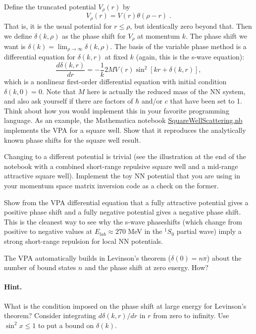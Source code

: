 \documentclass[%
oneside,                 %
final,                   %
10pt]{article}
\begin{document}
Define the truncated potential $V_\rho(r)$ by
\[
   V_\rho(r) = V(r) \theta(\rho-r) \;.
\]
That is, it is the usual potential for $r \leq \rho$, but identically
zero beyond that.  Then we define $\delta(k,\rho)$ as the phase shift
for $V_\rho$ at momentum $k$.  The phase shift we want is
$\delta(k) = \lim_{\rho\rightarrow\infty} \delta(k,\rho)$.  The basis
of the variable phase method is a differential equation for $\delta(k,r)$
at fixed $k$ (again, this is the s-wave equation):
\[
\frac{d\delta(k,r)}{dr} = -\frac{1}{k} 2M V(r) \sin^2[kr + \delta(k,r)],
\]
which is a nonlinear first-order differential equation with initial
condition $\delta(k,0) = 0$.  Note that $M$ here is actually the reduced mass of the NN system, and also ask yourself if there are factors of $\hbar$ and/or $c$ that have been set to 1. Think about how you would implement
this in your favorite programming language.  
As an example, the Mathematica notebook \href{{https://github.com/ManyBodyPhysics/NuclearForces/tree/master/doc/Projects/2017/Project1}}{SquareWellScattering.nb} implements
the VPA for a square well.   Show that it reproduces the analytically known phase shifts for the square well result. 

Changing to a different potential is trivial (see the illustration at the end of the notebook with a combined short-range repulsive
square well and a mid-range attractive square well).  Implement the toy NN potential that you are using in your momentum space matrix inversion code as a check on the former. 

Show from the VPA differential equation that a fully attractive potential gives
a positive phase shift and a fully negative potential gives a
negative phase shift. This is the cleanest way to see why the s-wave phaseshifts (which change from positive to negative values at $E_{lab}\approx 270$ MeV in the $^1S_0$ partial wave) imply a strong short-range repulsion for local NN potentials.

The VPA automatically builds in Levinson's theorem ($\delta(0) = n\pi$) about the number
of bound states $n$ and the phase shift at zero energy.  How?
\paragraph{Hint.}

What is the
condition imposed on the phase shift at large energy for Levinson's theorem?  Consider
integrating $d\delta(k,r)/dr$ in $r$ from zero to infinity.  Use $\sin^2 x \leq 1$
to put a bound on $\delta(k)$.
\end{document}
